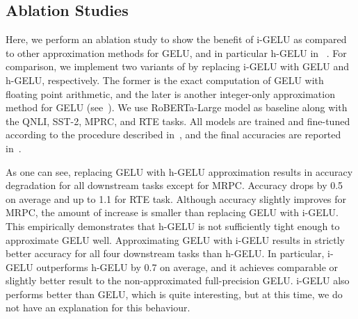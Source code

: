 \subsection{\textbf{Ablation Studies}}
\label{subsection:ablation_studies}

Here, we perform an ablation study to show the benefit of i-GELU as compared to
other approximation methods for GELU, and in particular h-GELU in ~. 
For comparison, we implement two variants of \OURS by replacing i-GELU with GELU and h-GELU, respectively.
The former is the exact computation of GELU with floating point arithmetic, 
and the later is another integer-only approximation method for GELU (see~).
We use RoBERTa-Large model as baseline along with the QNLI, SST-2, MPRC, and RTE tasks.
All models are trained and fine-tuned according to the procedure described in~, and the final accuracies are reported in~.

As one can see, replacing GELU with h-GELU approximation results in accuracy degradation for all downstream tasks except for MRPC.
Accuracy drops by 0.5 on average and up to 1.1 for RTE task.
Although accuracy slightly improves for MRPC, the amount of increase is smaller than replacing GELU with i-GELU.
This empirically demonstrates that h-GELU is not sufficiently tight enough to approximate GELU well.
Approximating GELU with i-GELU results in strictly better accuracy for all four downstream tasks than h-GELU.
In particular, i-GELU outperforms h-GELU by 0.7 on average, and it achieves comparable or slightly better result to the non-approximated full-precision GELU. 
i-GELU also performs better than GELU, which is quite interesting, but at this
time, we do not have an explanation for this behaviour.


\begin{table}[t]
\caption{ 
Accuracy of models that use GELU, h-GELU and i-GELU for GELU computation. Note that the former is full-precision, floating point computation while the latter two are integer-only approximations. 
}
\vskip 0.1in
\label{tab:gelu_comparison}
    \centering
    \small{
    }
\vspace{3mm}
\end{table}
